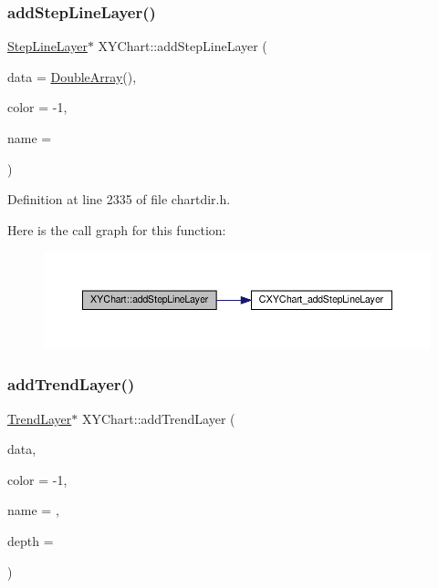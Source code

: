\subsubsection{\texorpdfstring{add\+Step\+Line\+Layer()}{addStepLineLayer()}}
{\footnotesize\ttfamily \hyperlink{class_step_line_layer}{Step\+Line\+Layer}$\ast$ X\+Y\+Chart\+::add\+Step\+Line\+Layer (\begin{DoxyParamCaption}\item[{\hyperlink{class_double_array}{Double\+Array}}]{data = {\ttfamily \hyperlink{class_double_array}{Double\+Array}()},  }\item[{int}]{color = {\ttfamily -\/1},  }\item[{const char $\ast$}]{name = {} }\end{DoxyParamCaption})\hspace{0.3cm}{\ttfamily [inline]}}



Definition at line 2335 of file chartdir.\+h.

Here is the call graph for this function\+:
\nopagebreak
\begin{figure}[H]
\begin{center}
\leavevmode
\includegraphics[width=350pt]{class_x_y_chart_a6e09d8cb36b0c8299c44836f687595b1_cgraph}
\end{center}
\end{figure}
\mbox{\label{class_x_y_chart_ab6eacb1530fecf9d3498b6880c5f1944}} 
\subsubsection{\texorpdfstring{add\+Trend\+Layer()}{addTrendLayer()}\hspace{0.1cm}{\footnotesize\ttfamily [1/2]}}
{\footnotesize\ttfamily \hyperlink{class_trend_layer}{Trend\+Layer}$\ast$ X\+Y\+Chart\+::add\+Trend\+Layer (\begin{DoxyParamCaption}\item[{\hyperlink{class_double_array}{Double\+Array}}]{data,  }\item[{int}]{color = {\ttfamily -\/1},  }\item[{const char $\ast$}]{name = {},  }\item[{int}]{depth = {} }\end{DoxyParamCaption})\hspace{0.3cm}{\ttfamily [inline]}}



